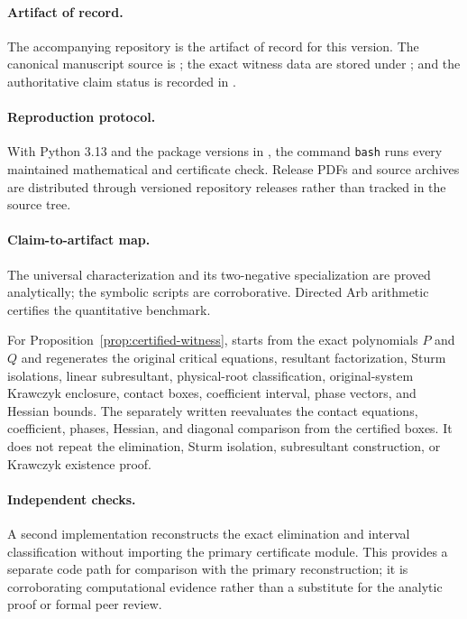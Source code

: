 \documentclass[11pt]{article}
\theoremstyle{plain}
\theoremstyle{definition}
\theoremstyle{remark}
\begin{document}
\paragraph{Artifact of record.}
The accompanying repository is the artifact of record for this version. The canonical manuscript source is ; the exact witness data are stored under ; and the authoritative claim status is recorded in .

\paragraph{Reproduction protocol.}
With Python 3.13 and the package versions in , the command \texttt{bash}  runs every maintained mathematical and certificate check. Release PDFs and source archives are distributed through versioned repository releases rather than tracked in the source tree.

\paragraph{Claim-to-artifact map.}
The universal characterization and its two-negative specialization are proved analytically; the symbolic scripts are corroborative. Directed Arb arithmetic certifies the quantitative benchmark.

For Proposition~\ref{prop:certified-witness},  starts from the exact polynomials $P$ and $Q$ and regenerates the original critical equations, resultant factorization, Sturm isolations, linear subresultant, physical-root classification, original-system Krawczyk enclosure, contact boxes, coefficient interval, phase vectors, and Hessian bounds. The separately written  reevaluates the contact equations, coefficient, phases, Hessian, and diagonal comparison from the certified boxes. It does not repeat the elimination, Sturm isolation, subresultant construction, or Krawczyk existence proof.

\paragraph{Independent checks.}
A second implementation reconstructs the exact elimination and interval classification without importing the primary certificate module. This provides a separate code path for comparison with the primary reconstruction; it is corroborating computational evidence rather than a substitute for the analytic proof or formal peer review.
\end{document}
